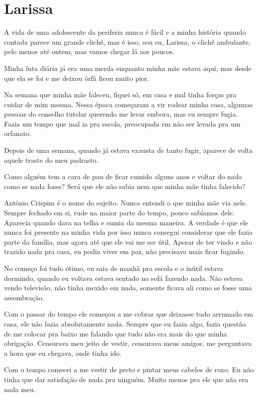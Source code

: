 \chapter{Larissa}
A vida de uma adolescente da periferia nunca é fácil e a minha história quando contada parece um grande clichê, mas é isso, sou eu, Larissa, o clichê ambulante, pelo menos até ontem, mas vamos chegar lá aos poucos.

Minha luta diária já era uma merda enquanto minha mãe estava aqui, mas desde que ela se foi e me deixou órfã ficou muito pior.

Na semana que minha mãe faleceu, fiquei só, em casa e mal tinha forças pra cuidar de mim mesma. Nessa época começaram a vir rodear minha casa, algumas pessoas do conselho tutelar querendo me levar embora, mas eu sempre fugia. Fazia um tempo que mal ia pra escola, preocupada em não ser levada pra um orfanato.

Depois de uma semana, quando já estava exausta de tanto fugir, aparece de volta aquele traste do meu padrasto. 

Como alguém tem a cara de pau de ficar sumido alguns anos e voltar do nada como se nada fosse? Será que ele não sabia nem que minha mãe tinha falecido?

Antônio Crispim é o nome do sujeito. Nunca entendi o que minha mãe via nele. Sempre fechado em si, rude na maior parte do tempo, pouco sabíamos dele. Aparecia quando dava na telha e sumia da mesma maneira. A verdade é que ele nunca foi presente na minha vida por isso nunca consegui considerar que ele fazia parte da família, mas agora até que ele vai me ser útil. Apesar de ter vindo e não trazido nada pra casa, eu podia viver em paz, não precisava mais ficar fugindo.

No começo foi tudo ótimo, eu saia de manhã pra escola e o inútil estava dormindo, quando eu voltava estava sentado no sofá fazendo nada. Não estava vendo televisão, não tinha mexido em nada, somente ficava ali como se fosse uma assombração.

Com o passar do tempo ele começou a me cobrar que deixasse tudo arrumado em casa, ele não fazia absolutamente nada. Sempre que eu fazia algo, fazia questão de me colocar pra baixo me falando que tudo não era mais do que minha obrigação. Censurava meu jeito de vestir, censurava meus amigos, me perguntava a hora que eu chegava, onde tinha ido.

Com o tempo comecei a me vestir de preto e pintar meus cabelos de roxo. Eu não tinha que dar satisfação de nada pra ninguém. Muito menos pra ele que não era nada meu.

